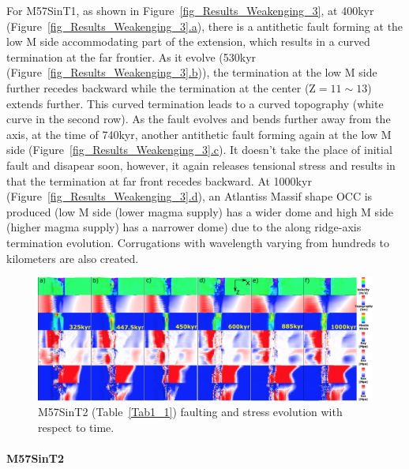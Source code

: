 For M57SinT1, as shown in Figure~\hyperref[fig_Results_Weakenging_3]{\ref{fig_Results_Weakenging_3}}, at 400kyr (Figure~\hyperref[fig_Results_Weakenging_3]{\ref{fig_Results_Weakenging_3}.a}), there is a antithetic fault forming at the low M side accommodating part of the extension, which results in a curved termination at the far frontier. As it evolve (530kyr (Figure~\hyperref[fig_Results_Weakenging_3]{\ref{fig_Results_Weakenging_3}.b})), the termination at the low M side further recedes backward while the termination at the center (Z$=11\sim13$) extends further. This curved termination leads to a curved topography (white curve in the second row). As the fault evolves and bends further away from the axis, at the time of 740kyr, another antithetic fault forming again at the low M side (Figure~\hyperref[fig_Results_Weakenging_3]{\ref{fig_Results_Weakenging_3}.c}). It doesn't take the place of initial fault and disapear soon, however, it again releases tensional stress and results in that the termination at far front recedes backward. At 1000kyr (Figure~\hyperref[fig_Results_Weakenging_3]{\ref{fig_Results_Weakenging_3}.d}), an Atlantiss Massif shape OCC is produced (low M side (lower magma supply) has a wider dome and high M side (higher magma supply) has a narrower dome) due to the along ridge-axis termination evolution. Corrugations with wavelength varying from hundreds to kilometers are also created.       

\begin{figure}[h]
 \centering
  \includegraphics[width=1.0\textwidth]{./Figures/fig_Results_Weakening_4_M57SinT2_time_evolution.eps}
 \caption{M57SinT2 (Table~\hyperref[Tab1_1]{\ref{Tab1_1}}) faulting and stress evolution with respect to time.}
\label{fig_Results_Weakenging_4}
\end{figure}

\paragraph{M57SinT2}\label{para_M57SinT2}

